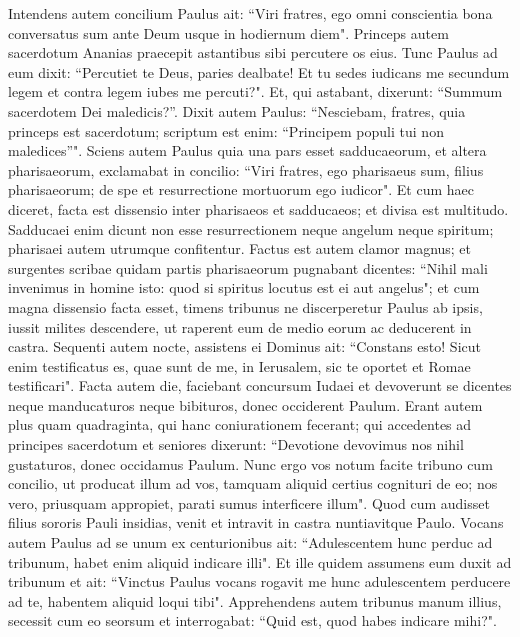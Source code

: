\begin{biblechapter}  
\verse Intendens autem concilium Paulus ait: “Viri fratres, ego omni conscientia bona conversatus sum ante Deum usque in hodiernum diem". 
\verse Princeps autem sacerdotum Ananias praecepit astantibus sibi percutere os eius.  
\verse Tunc Paulus ad eum dixit: “Percutiet te Deus, paries dealbate! Et tu sedes iudicans me secundum legem et contra legem iubes me percuti?". 
\verse Et, qui astabant, dixerunt: “Summum sacerdotem Dei maledicis?”. 
\verse Dixit autem Paulus: “Nesciebam, fratres, quia princeps est sacerdotum; scriptum est enim: “Principem populi tui non maledices”". 
\verse Sciens autem Paulus quia una pars esset sadducaeorum, et altera pharisaeorum, exclamabat in concilio: “Viri fratres, ego pharisaeus sum, filius pharisaeorum; de spe et resurrectione mortuorum ego iudicor". 
\verse Et cum haec diceret, facta est dissensio inter pharisaeos et sadducaeos; et divisa est multitudo.  
\verse Sadducaei enim dicunt non esse resurrectionem neque angelum neque spiritum; pharisaei autem utrumque confitentur. 
\verse Factus est autem clamor magnus; et surgentes scribae quidam partis pharisaeorum pugnabant dicentes: “Nihil mali invenimus in homine isto: quod si spiritus locutus est ei aut angelus"; 
\verse et cum magna dissensio facta esset, timens tribunus ne discerperetur Paulus ab ipsis, iussit milites descendere, ut raperent eum de medio eorum ac deducerent in castra. 
\verse Sequenti autem nocte, assistens ei Dominus ait: “Constans esto! Sicut enim testificatus es, quae sunt de me, in Ierusalem, sic te oportet et Romae testificari". 
\verse Facta autem die, faciebant concursum Iudaei et devoverunt se dicentes neque manducaturos neque bibituros, donec occiderent Paulum. 
\verse Erant autem plus quam quadraginta, qui hanc coniurationem fecerant; 
\verse qui accedentes ad principes sacerdotum et seniores dixerunt: “Devotione devovimus nos nihil gustaturos, donec occidamus Paulum. 
\verse Nunc ergo vos notum facite tribuno cum concilio, ut producat illum ad vos, tamquam aliquid certius cognituri de eo; nos vero, priusquam appropiet, parati sumus interficere illum". 
\verse Quod cum audisset filius sororis Pauli insidias, venit et intravit in castra nuntiavitque Paulo. 
\verse Vocans autem Paulus ad se unum ex centurionibus ait: “Adulescentem hunc perduc ad tribunum, habet enim aliquid indicare illi".  
\verse Et ille quidem assumens eum duxit ad tribunum et ait: “Vinctus Paulus vocans rogavit me hunc adulescentem perducere ad te, habentem aliquid loqui tibi". 
\verse Apprehendens autem tribunus manum illius, secessit cum eo seorsum et interrogabat: “Quid est, quod habes indicare mihi?". 

\end{biblechapter}
